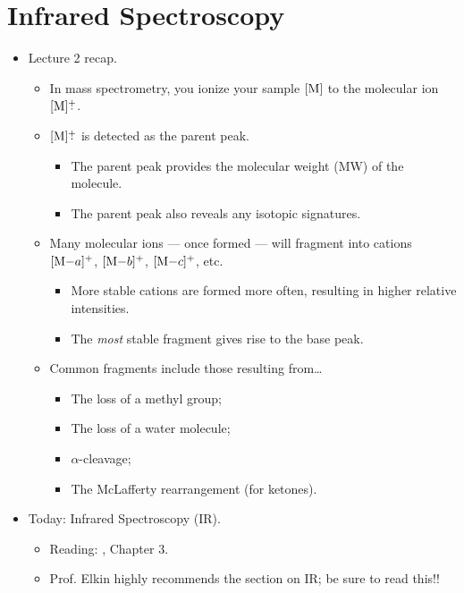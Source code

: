 \documentclass[../notes.tex]{subfiles}
\begin{document}
\section{Infrared Spectroscopy}
\begin{itemize}
    \item {}Lecture 2 recap.
    \begin{itemize}
        \item In mass spectrometry, you ionize your sample $\cnc{M}$ to the molecular ion $\cnc{M}\rc$.
        \item $\cnc{M}\rc$ is detected as the parent peak.
        \begin{itemize}
            \item The parent peak provides the molecular weight (MW) of the molecule.
            \item The parent peak also reveals any isotopic signatures.
        \end{itemize}
        \item Many molecular ions --- once formed --- will fragment into cations $\cnc{M$-a$}^+$, $\cnc{M$-b$}^+$, $\cnc{M$-c$}^+$, etc.
        \begin{itemize}
            \item More stable cations are formed more often, resulting in higher relative intensities.
            \item The \emph{most} stable fragment gives rise to the base peak.
        \end{itemize}
        \item Common fragments include those resulting from\dots
        \begin{itemize}
            \item The loss of a methyl group;
            \item The loss of a water molecule;
            \item $\alpha$-cleavage;
            \item The McLafferty rearrangement (for ketones).
        \end{itemize}
    \end{itemize}
    \item Today: Infrared Spectroscopy (IR).
    \begin{itemize}
        \item Reading: \textcite{bib:Clayden}, Chapter 3.
        \item Prof. Elkin highly recommends the section on IR; be sure to read this!!
    \end{itemize}

\end{itemize}
\end{document}
